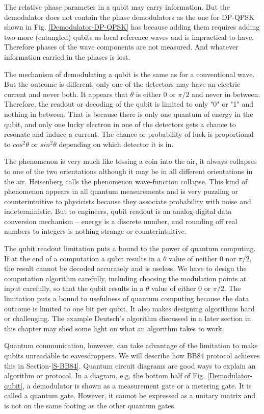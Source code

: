\documentclass[oneside, letter, 12pt]{book}
\begin{document}
The relative phase parameter in a qubit may carry information. But the demodulator does not contain the phase demodulators as the one for DP-QPSK shown in Fig. \ref{Demodulator-DP-QPSK} has because adding them requires adding two more (entangled) qubits as local reference waves and is impractical to have. Therefore phases of the wave components are not measured. And whatever information carried in the phases is lost.

The mechanism of demodulating a qubit is the same as for a conventional wave. But the outcome is different: only one of the detectors may have an electric current and never both. It appears that $\theta$ is either 0 or $\pi/2$ and never in between. Therefore, the readout or decoding of the qubit is limited to only "0" or "1" and nothing in between. That is because there is only one quantum of energy in the qubit, and only one lucky electron in one of the detectors gets a chance to resonate and induce a current. The chance or probability of luck is proportional to $cos^2\theta$ or $sin^2\theta$ depending on which detector it is in.

The phenomenon is very much like tossing a coin into the air, it always collapses to one of the two orientations although it may be in all different orientations in the air. Heisenberg calls the phenomenon wave-function collapse. This kind of phenomenon appears in all quantum measurements and is very puzzling or counterintuitive to physicists because they associate probability with noise and indeterministic. But to engineers, qubit readout is an analog-digital data conversion mechanism -- energy is a discrete number, and rounding off real numbers to integers is nothing strange or counterintuitive.

The qubit readout limitation puts a bound to the power of quantum computing. If at the end of a computation a qubit results in a $\theta$ value of neither 0 nor $\pi/2$, the result cannot be decoded accurately and is useless. We have to design the computation algorithm carefully, including choosing the modulation points at input carefully, so that the qubit results in a $\theta$ value of either 0 or $\pi /2$. The limitation puts a bound to usefulness of quantum computing because the data outcome is limited to one bit per qubit. It also makes designing algorithms hard or challenging. The example Deutsch's algorithm discussed in a later section in this chapter may shed some light on what an algorithm takes to work.

Quantum communication, however, can take advantage of the limitation to make qubits unreadable to eavesdroppers. We will describe how BB84 protocol achieves this in Section-\ref{S-BB84}. Quantum circuit diagrams are good ways to explain an algorithm or protocol. In a diagram, e.g. the bottom half of Fig. \ref{Demodulator-qubit}, a demodulator is shown as a measurement gate or a metering gate. It is called a quantum gate. However, it cannot be expressed as a unitary matrix and is not on the same footing as the other quantum gates.
\end{document}
